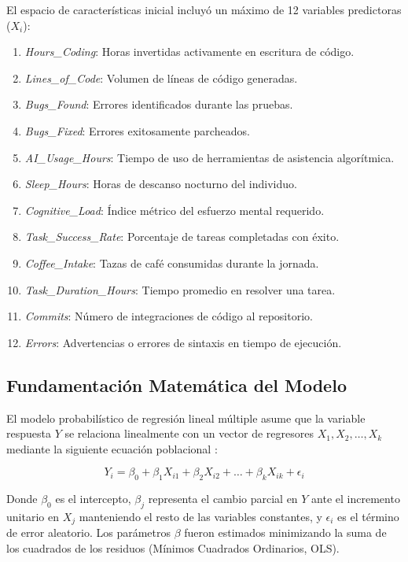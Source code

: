 \documentclass[conference]{IEEEtran}
\begin{document}
El espacio de características inicial incluyó un máximo de 12 variables predictoras ($X_i$):
\begin{enumerate}
    \item \textit{Hours\_Coding}: Horas invertidas activamente en escritura de código.
    \item \textit{Lines\_of\_Code}: Volumen de líneas de código generadas.
    \item \textit{Bugs\_Found}: Errores identificados durante las pruebas.
    \item \textit{Bugs\_Fixed}: Errores exitosamente parcheados.
    \item \textit{AI\_Usage\_Hours}: Tiempo de uso de herramientas de asistencia algorítmica.
    \item \textit{Sleep\_Hours}: Horas de descanso nocturno del individuo.
    \item \textit{Cognitive\_Load}: Índice métrico del esfuerzo mental requerido.
    \item \textit{Task\_Success\_Rate}: Porcentaje de tareas completadas con éxito.
    \item \textit{Coffee\_Intake}: Tazas de café consumidas durante la jornada.
    \item \textit{Task\_Duration\_Hours}: Tiempo promedio en resolver una tarea.
    \item \textit{Commits}: Número de integraciones de código al repositorio.
    \item \textit{Errors}: Advertencias o errores de sintaxis en tiempo de ejecución.
\end{enumerate}

\subsection{Fundamentación Matemática del Modelo}
El modelo probabilístico de regresión lineal múltiple asume que la variable respuesta $Y$ se relaciona linealmente con un vector de regresores $X_1, X_2, \dots, X_k$ mediante la siguiente ecuación poblacional \cite{kutner}:

\begin{equation}
Y_i = \beta_0 + \beta_1 X_{i1} + \beta_2 X_{i2} + \dots + \beta_k X_{ik} + \epsilon_i
\end{equation}

Donde $\beta_0$ es el intercepto, $\beta_j$ representa el cambio parcial en $Y$ ante el incremento unitario en $X_j$ manteniendo el resto de las variables constantes, y $\epsilon_i$ es el término de error aleatorio. Los parámetros $\beta$ fueron estimados minimizando la suma de los cuadrados de los residuos (Mínimos Cuadrados Ordinarios, OLS).
\end{document}
